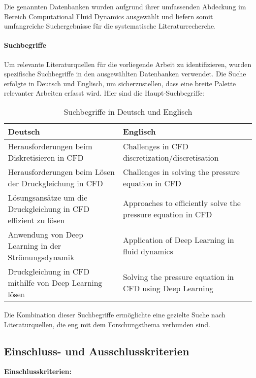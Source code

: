 Die genannten Datenbanken wurden aufgrund ihrer umfassenden Abdeckung im Bereich Computational Fluid Dynamics ausgewählt und liefern somit umfangreiche Suchergebnisse für die systematische Literaturrecherche.

\paragraph{Suchbegriffe}

Um relevante Literaturquellen für die vorliegende Arbeit zu identifizieren, wurden spezifische Suchbegriffe in den ausgewählten Datenbanken verwendet. Die Suche erfolgte in Deutsch und Englisch, um sicherzustellen, dass eine breite Palette relevanter Arbeiten erfasst wird. Hier sind die Haupt-Suchbegriffe:

\begin{table}[ht]
    \centering
    \small
    \begin{tabular}{p{}|p{}}
        \toprule
        \textbf{Deutsch} & \textbf{Englisch} \\
        \midrule
        Herausforderungen beim Diskretisieren in CFD & Challenges in CFD discretization/discretisation \\
        \midrule
        Herausforderungen beim Lösen der Druckgleichung in CFD & Challenges in solving the pressure equation in CFD \\
        \midrule
        Lösungsansätze um die Druckgleichung in CFD effizient zu lösen & Approaches to efficiently solve the pressure equation in CFD \\
        \midrule
        Anwendung von Deep Learning in der Strömungsdynamik & Application of Deep Learning in fluid dynamics \\
        \midrule
        Druckgleichung in CFD mithilfe von Deep Learning lösen & Solving the pressure equation in CFD using Deep Learning \\
        \bottomrule
    \end{tabular}
    \caption{Suchbegriffe in Deutsch und Englisch}
    \label{tab:search_terms}
\end{table}

Die Kombination dieser Suchbegriffe ermöglichte eine gezielte Suche nach Literaturquellen, die eng mit dem Forschungsthema verbunden sind.

\subsection{Einschluss- und Ausschlusskriterien}
\textbf{Einschlusskriterien:}

